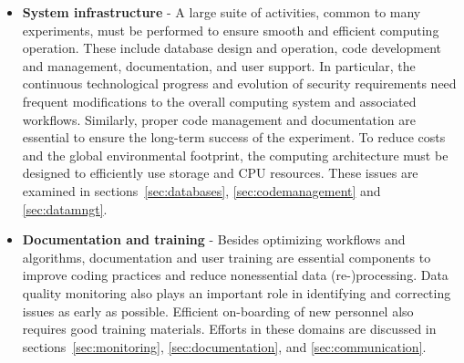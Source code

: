 \begin{itemize}
\item[] {\bf System infrastructure} - A large suite of activities, common to many experiments, must be performed to ensure smooth and efficient computing operation. These include database design and operation, code development and management, documentation, and user support. In particular, the continuous technological progress and evolution of security requirements need frequent modifications to the overall computing system and associated workflows. Similarly, proper code management and documentation are essential to ensure the long-term success of the experiment. To reduce costs and the global environmental footprint, the computing architecture must be designed to efficiently use storage and CPU resources. These issues are examined in sections~\ref{sec:databases}, \ref{sec:codemanagement} and \ref{sec:datamngt}.

\item[] {\bf Documentation and training} - Besides optimizing workflows and algorithms, documentation and user training are essential components to improve coding practices and reduce nonessential data (re-)processing. Data quality monitoring also plays an important role in identifying and correcting issues as early as possible. Efficient on-boarding of new personnel also requires good training materials. Efforts in these domains are discussed in sections~\ref{sec:monitoring}, \ref{sec:documentation}, and \ref{sec:communication}.
\end{itemize} 